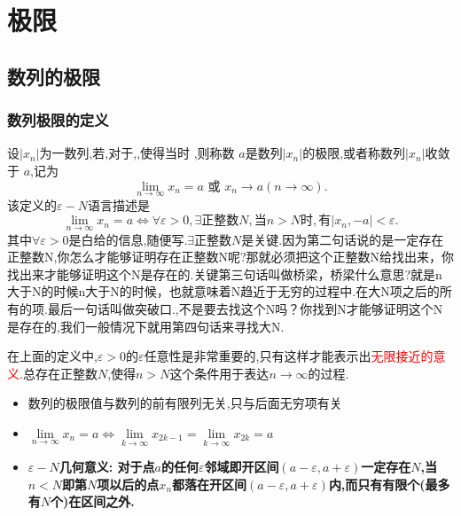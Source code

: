 \documentclass[12pt, a4paper, oneside, UTF8]{ctexbook}  %
\begin{document}
\begin{sloppypar}
    \else
    \fi
    \chapter{极限}
    \section{数列的极限}
    \subsection{数列极限的定义}
    \begin{defn}{}{}
        设$|x_n|$为一数列,若,对于,,使得当时 ,则称数 $a$是数列$| x_n |$的极限,或者称数列$| x_n |$收敛于 $a$,记为
        $$
            \lim_{n\to\infty}x_n=a\text{ 或 }x_n\to a(n\to\infty).
        $$
        该定义的$\varepsilon-N$语言描述是\\
        $$\lim_{n\to\infty}x_n=a\Leftrightarrow\forall\varepsilon>0,\exists\text{正整数}N,\text{当}n>N\text{时},\text{有}|x_n,-a|<\varepsilon.$$
        其中$\forall\varepsilon>0$是白给的信息,随便写.$\exists\text{正整数}N$是关键.因为第二句话说的是一定存在正整数N,你怎么才能够证明存在正整数N呢?那就必须把这个正整数N给找出来，你找出来才能够证明这个N是存在的.关键第三句话叫做桥梁，桥梁什么意思?就是n大于N的时候n大于N的时候，也就意味着N趋近于无穷的过程中.在大N项之后的所有的项.最后一句话叫做突破口.,不是要去找这个N吗？你找到N才能够证明这个N是存在的,我们一般情况下就用第四句话来寻找大N.
    \end{defn}
    在上面的定义中,$\varepsilon>0$的$\varepsilon$任意性是非常重要的,只有这样才能表示出\textcolor{red}{无限接近的意义}.总存在正整数$N$,使得$n>N$这个条件用于表达$n \to \infty$的过程.
    \begin{criterion}{}{}
        \begin{itemize}
            \item 数列的极限值与数列的前有限列无关,只与后面无穷项有关
            \item $\underset{n\to\infty}{\operatorname*{\lim}}x_n=a\Leftrightarrow\underset{k\to\infty}{\operatorname*{\lim}}x_{2k-1}=\underset{k\to\infty}{\operatorname*{\lim}}x_{2k}=a$
            \item $\varepsilon - N$\textbf{几何意义: 对于点$a$的任何$\varepsilon$邻域即开区间$(a-\varepsilon,a+\varepsilon)$一定存在$N$,当$n < N$即第$N$项以后的点$x_n$都落在开区间$(a-\varepsilon,a+\varepsilon)$内,而只有有限个(最多有$N$个)在区间之外.}
        \end{itemize}
    \end{criterion}


\end{sloppypar}
\end{document}
